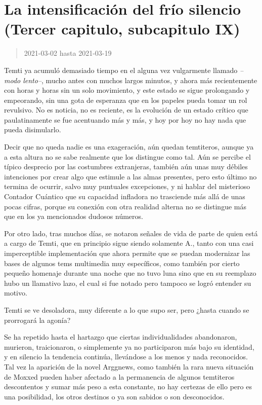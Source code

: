 \documentclass[
  spanish,
]{book}
\begin{document}
\hypertarget{la-intensificaciuxf3n-del-fruxedo-silencio-tercer-capitulo-subcapitulo-ix}{%
\section{La intensificación del frío silencio (Tercer capitulo, subcapitulo IX)}\label{la-intensificaciuxf3n-del-fruxedo-silencio-tercer-capitulo-subcapitulo-ix}}

\begin{quote}
2021-03-02 hasta 2021-03-19
\end{quote}

Temti ya acumuló demasiado tiempo en el alguna vez vulgarmente llamado \emph{--modo lento--}, mucho antes con muchos largos minutos, y ahora más recientemente con horas y horas sin un solo movimiento, y este estado se sigue prolongando y empeorando, sin una gota de esperanza que en los papeles pueda tomar un rol revulsivo. No es noticia, no es reciente, es la evolución de un estado crítico que paulatinamente se fue acentuando más y más, y hoy por hoy no hay nada que pueda disimularlo.

Decir que no queda nadie es una exageración, aún quedan temtiteros, aunque ya a esta altura no se sabe realmente que los distingue como tal. Aún se percibe el típico desprecio por las costumbres extranjeras, también aún unas muy débiles intenciones por crear algo que estimule a las almas presentes, pero esto último no termina de ocurrir, salvo muy puntuales excepciones, y ni hablar del misterioso Contador Cuántico que su capacidad infladora no trasciende más allá de unas pocas cifras, porque su conexión con otra realidad alterna no se distingue más que en los ya mencionados dudosos números.

Por otro lado, tras muchos días, se notaron señales de vida de parte de quien está a cargo de Temti, que en principio sigue siendo solamente A., tanto con una casi imperceptible implementación que ahora permite que se puedan modernizar las bases de algunos tems multimedia muy específicos, como también por cierto pequeño homenaje durante una noche que no tuvo luna sino que en su reemplazo hubo un llamativo lazo, el cual si fue notado pero tampoco se logró entender su motivo.

Temti se ve desoladora, muy diferente a lo que supo ser, pero ¿hasta cuando se prorrogará la agonía?

Se ha repetido hasta el hartazgo que ciertas individualidades abandonaron, murieron, traicionaron, o simplemente ya no participaron más bajo su identidad, y en silencio la tendencia continúa, llevándose a los menos y nada reconocidos. Tal vez la aparición de la novel Arggnews, como también la rara nueva situación de Moxxed pueden haber afectado a la permanencia de algunos temtiteros descontentos y sumar más peso a esta constante, no hay certezas de ello pero es una posibilidad, los otros destinos o ya son sabidos o son desconocidos.
\end{document}
